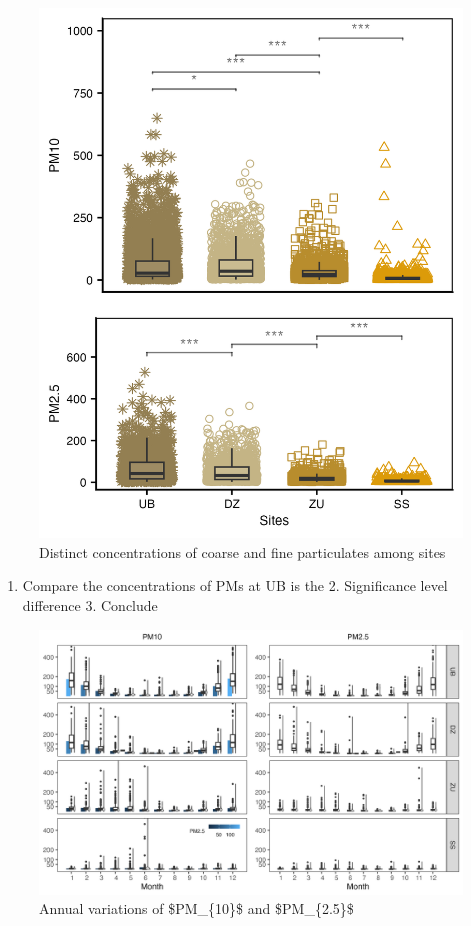 \documentclass[
  11pt,
]{article}
\providecommand{\tightlist}{%
  \setlength{\itemsep}{0pt}\setlength{\parskip}{0pt}}
\begin{document}
\begin{figure}
\centering
\includegraphics[width=5.20833in,height=\textheight,keepaspectratio]{images/figure_3.png}
\caption{Distinct concentrations of coarse and fine particulates among
sites}
\end{figure}

\begin{enumerate}
\def\labelenumi{\arabic{enumi}.}
\tightlist
\item
  Compare the concentrations of PMs at UB is the 2. Significance level
  difference 3. Conclude
\end{enumerate}

\newpage

\begin{figure}
\centering
\includegraphics[width=5.52083in,height=\textheight,keepaspectratio]{images/figure_4.png}
\caption{Annual variations of \$PM\_\{10\}\$ and \$PM\_\{2.5\}\$}
\end{figure}
\end{document}
